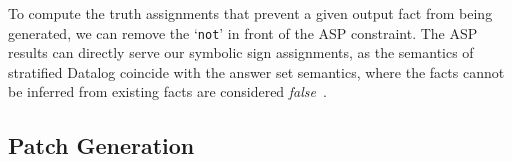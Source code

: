 

To compute the truth assignments that prevent a given output fact from being generated, we can remove the `\lstinline{not}' in front of the ASP constraint.
The ASP %
results can directly serve our symbolic sign assignments, as the semantics of stratified Datalog coincide with the answer set semantics, where the facts cannot be inferred from existing facts are considered \emph{false}~\cite{tekle2019extended}.


\subsection{Patch Generation}


